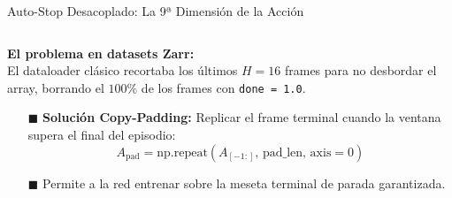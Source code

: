 \begin{frame}{Auto-Stop Desacoplado: La 9ª Dimensión de la Acción}
\begin{columns}[T, onlytextwidth]
    \begin{column}{0.485\textwidth}
      \begin{tcolorbox}[
        enhanced,
        colback=WhiteBg,
        colframe=UCNBlue,
        arc=\CardArc,
        boxrule=\CardRule,
        height=\CardHeightDouble,
        title={\CardTitleFont El Horizon Truncation Bug y Copy-Padding},
        colbacktitle=UCNBlue,
        coltitle=WhiteBg,
        top=1.0mm, bottom=1.0mm, left=1.6mm, right=1.6mm
      ]
        {\BodyFont
        \textbf{El problema en datasets Zarr:}\\
        El dataloader clásico recortaba los últimos $H=16$ frames para no desbordar el array, borrando el $100\%$ de los frames con \texttt{done = 1.0}.
        \vspace{0.4mm}
        \begin{itemize}\setlength{\itemsep}{1.0pt}
          \item[\textcolor{AgriGreen}{$\blacksquare$}] \textbf{Solución Copy-Padding:} Replicar el frame terminal cuando la ventana supera el final del episodio:
          \vspace{-0.5mm}
          \[
            A_{\text{pad}} = \text{np.repeat}(A_{[-1:]}, \, \text{pad\_len}, \, \text{axis}=0)
          \]
          \vspace{-1.5mm}
          \item[\textcolor{AgriGreen}{$\blacksquare$}] Permite a la red entrenar sobre la meseta terminal de parada garantizada.
        \end{itemize}}
      \end{tcolorbox}
    \end{column}
  \end{columns}
\end{frame}

